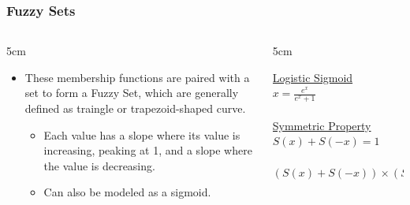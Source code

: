 \documentclass{beamer}
\begin{document}
   \begin{frame}
      \frametitle{Fuzzy Sets}
      \begin{columns}[T]
         \begin{column}[T]{5cm}
            \begin{itemize}
               \item These membership functions are paired with a set to form a Fuzzy Set, which are generally defined as traingle or trapezoid-shaped curve.
               \begin{itemize}
                  \item Each value has a slope where its value is increasing, peaking at 1, and a slope where the value is decreasing.
                  \item Can also be modeled as a sigmoid.
               \end{itemize}
            \end{itemize}
         \end{column}
         \begin{column}[T]{5cm}
            \begin{center}
               \underline{Logistic Sigmoid} \\
               $ x = \frac{e^{x}}{e^{x}+1} $ \\~\\
               \underline{Symmetric Property} \\
               $ S(x) + S(-x) =  1 $ \\~\\
               $ (S(x) + S(-x)) \times (S(y) + S(-y)) \times (S(z) + S(-z)) = 1 $ 
            \end{center}
         \end{column}
      \end{columns}
   \end{frame}
\end{document}
